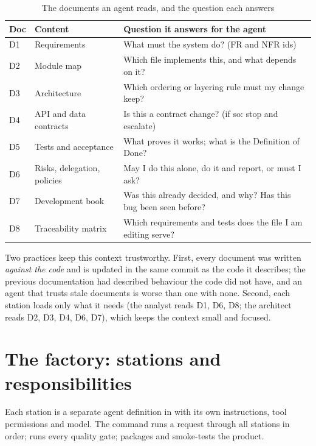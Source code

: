 \documentclass[../main.tex]{subfiles}
\begin{document}
\begin{table}[H]
\centering
\caption{The documents an agent reads, and the question each answers}\label{tab:context}
\renewcommand{\arraystretch}{1.2}
\begin{tabular}{|p{1.2cm}|p{4.2cm}|p{8.6cm}|}
\hline
\textbf{Doc} & \textbf{Content} & \textbf{Question it answers for the agent} \\ \hline
D1 & Requirements & What must the system do? (FR and NFR ids) \\ \hline
D2 & Module map & Which file implements this, and what depends on it? \\ \hline
D3 & Architecture & Which ordering or layering rule must my change keep? \\ \hline
D4 & API and data contracts & Is this a contract change? (if so: stop and escalate) \\ \hline
D5 & Tests and acceptance & What proves it works; what is the Definition of Done? \\ \hline
D6 & Risks, delegation, policies & May I do this alone, do it and report, or must I ask? \\ \hline
D7 & Development book & Was this already decided, and why? Has this bug been seen before? \\ \hline
D8 & Traceability matrix & Which requirements and tests does the file I am editing serve? \\ \hline
\end{tabular}
\end{table}

Two practices keep this context trustworthy. First, every document was written \emph{against the
code} and is updated in the same commit as the code it describes; the previous documentation had
described behaviour the code did not have, and an agent that trusts stale documents is worse than
one with none. Second, each station loads only what it needs (the analyst reads D1, D6, D8; the
architect reads D2, D3, D4, D6, D7), which keeps the context small and focused.

\section{The factory: stations and responsibilities}
Each station is a separate agent definition in  with its own instructions,
tool permissions and model. The command  runs a request through all
stations in order;  runs every quality gate;  packages and
smoke-tests the product.
\end{document}
